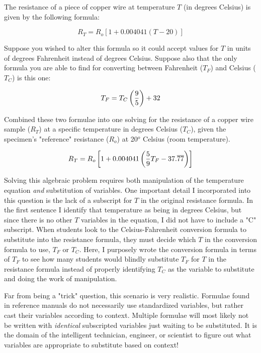 

The resistance of a piece of copper wire at temperature $T$ (in degrees Celsius) is given by the following formula:

$$R_T = R_o \left[1 + 0.004041(T - 20)\right]$$

Suppose you wished to alter this formula so it could accept values for $T$ in units of degrees Fahrenheit instead of degrees Celsius.  Suppose also that the only formula you are able to find for converting between Fahrenheit ($T_F$) and Celsius ($T_C$) is this one:

$$T_F = T_C \left({9 \over 5}\right) + 32$$

Combined these two formulae into one solving for the resistance of a copper wire sample ($R_T$) at a specific temperature in degrees Celsius ($T_C$), given the specimen's "reference" resistance ($R_o$) at 20$^{o}$ Celsius (room temperature).







$$R_T = R_o \left[1 + 0.004041\left({5 \over 9}T_F - 37.\overline{77}\right)\right]$$







Solving this algebraic problem requires both manipulation of the temperature equation {\it and} substitution of variables.  One important detail I incorporated into this question is the lack of a subscript for $T$ in the original resistance formula.  In the first sentence I identify that temperature as being in degrees Celsius, but since there is no other $T$ variables in the equation, I did not have to include a "C" subscript.  When students look to the Celsius-Fahrenheit conversion formula to substitute into the resistance formula, they must decide which $T$ in the conversion formula to use, $T_F$ or $T_C$.  Here, I purposely wrote the conversion formula in terms of $T_F$ to see how many students would blindly substitute $T_F$ for $T$ in the resistance formula instead of properly identifying $T_C$ as the variable to substitute and doing the work of manipulation.

Far from being a "trick" question, this scenario is very realistic.  Formulae found in reference manuals do not necessarily use standardized variables, but rather cast their variables according to context.  Multiple formulae will most likely not be written with {\it identical} subscripted variables just waiting to be substituted.  It is the domain of the intelligent technician, engineer, or scientist to figure out what variables are appropriate to substitute based on context!




